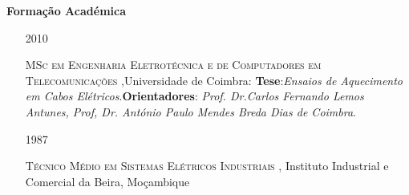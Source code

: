 \documentclass[10pt,a4paper,oneside]{article}
\newlength{\datewidth}
\newlength{\textindent}
\begin{document}
	\vspace{5mm}	
	\textbf{\hspace{\textindent}Formação Académica}
	\begin{itemize}
\item[\hspace{\datewidth}\scriptsize 2010] \parbox[t]{\dimexpr\linewidth-\datewidth-\textindent}{\textsc{MSc em Engenharia Eletrotécnica e de Computadores em Telecomunicações} ,Universidade de Coimbra: \textbf{Tese}:\textit{Ensaios de Aquecimento em Cabos Elétricos}.\textbf{Orientadores}: \textit{Prof. Dr.Carlos Fernando Lemos Antunes, Prof,  Dr. António Paulo Mendes Breda Dias de  Coimbra}.}		

		
		\item[\hspace{\datewidth}\scriptsize 1987] \parbox[t]{\dimexpr\linewidth-\datewidth-\textindent}{\textsc{Técnico Médio em Sistemas Elétricos Industriais }, Instituto Industrial e Comercial da Beira, Moçambique}
	\end{itemize}
	
	\vspace{5mm}
	
\end{document}
